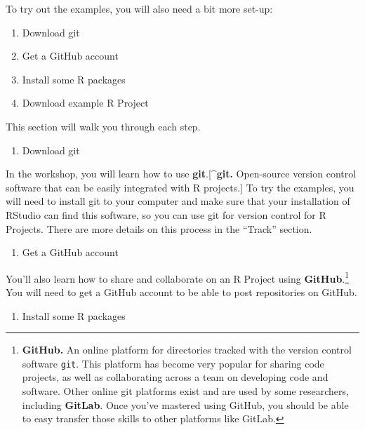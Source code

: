 \documentclass[]{tufte-book}
\providecommand{\tightlist}{%
  \setlength{\itemsep}{0pt}\setlength{\parskip}{0pt}}
\begin{document}
To try out the examples, you will also need a bit more set-up:

\begin{enumerate}
\def\labelenumi{\arabic{enumi}.}
\tightlist
\item
  Download git
\item
  Get a GitHub account
\item
  Install some R packages
\item
  Download example R Project
\end{enumerate}

This section will walk you through each step.

\begin{enumerate}
\def\labelenumi{\arabic{enumi}.}
\tightlist
\item
  Download git
\end{enumerate}

In the workshop, you will learn how to use \textbf{git}.{[}\^{}\textbf{git.} Open-source version control
software that can be easily integrated with R projects.{]} To try the examples, you will need to
install git to your computer and make
sure that your installation of RStudio can find this software, so you can use git for version
control for R Projects. There are more details on this process in the ``Track'' section.

\begin{enumerate}
\def\labelenumi{\arabic{enumi}.}
\setcounter{enumi}{1}
\tightlist
\item
  Get a GitHub account
\end{enumerate}

You'll also learn how to share and collaborate on an R Project using \textbf{GitHub}.\footnote{\textbf{GitHub.}
  An online platform for directories tracked with
  the version control software \texttt{git}. This platform has become
  very popular for sharing code projects, as well as collaborating across a team on developing
  code and software. Other online git platforms exist and are used by some researchers,
  including \textbf{GitLab}. Once you've mastered using GitHub, you should be able to easy
  transfer those skills to other platforms like GitLab.} You will need to get a GitHub
account to be able to post repositories on GitHub.

\begin{enumerate}
\def\labelenumi{\arabic{enumi}.}
\setcounter{enumi}{2}
\tightlist
\item
  Install some R packages
\end{enumerate}
\end{document}
